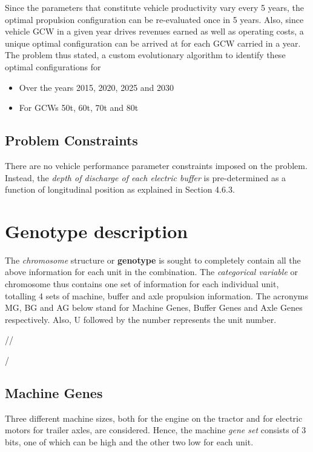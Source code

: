 \documentclass[ExampleMasters.tex]{subfiles}
\begin{document}
			Since the parameters that constitute vehicle productivity vary every 5 years, the optimal propulsion configuration can be re-evaluated once in 5 years. Also, since vehicle GCW in a given year drives revenues earned as well as operating costs, a unique optimal configuration can be arrived at for each GCW carried in a year.\\ 

			The problem thus stated, a custom evolutionary algorithm to identify these optimal configurations for
			\begin{itemize}
			\item Over the years 2015, 2020, 2025 and 2030
			\item For GCWs 50t, 60t, 70t and 80t
			\end{itemize}

		\subsection{Problem Constraints}
			There are no vehicle performance parameter constraints imposed on the problem. Instead, the \textit{depth of discharge of each electric buffer} is pre-determined as a function of longitudinal position as explained in Section 4.6.3.

	\section{Genotype description}
		
		The \textit{chromosome} structure or \textbf{genotype} is sought to completely contain all the above information for each unit in the combination. The \textit{categorical variable} or chromosome thus contains one set of information for each individual unit, totalling 4 sets of machine, buffer and axle propulsion information. The acronyms MG, BG and AG below stand for Machine Genes, Buffer Genes and Axle Genes respectively. Also, U followed by the number represents the unit number.\\

		\centerline{//\\}
		\centerline{/\\}

		\subsection{Machine Genes}
			Three different machine sizes, both for the engine on the tractor and for electric motors for trailer axles, are considered. Hence, the machine \textit{gene set} consists of 3 bits, one of which can be high and the other two low for each unit.\\
\end{document}
